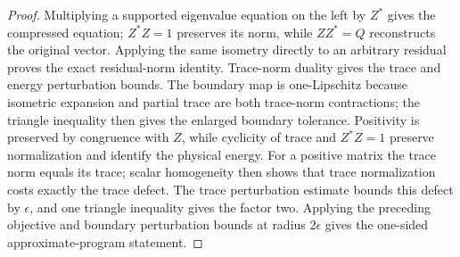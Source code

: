 \begin{proof}
    Multiplying a
    supported eigenvalue equation on the
    left by $Z^*$ gives the compressed equation; $Z^*Z=1$ preserves its norm,
    while $ZZ^*=Q$ reconstructs the original vector.
    Applying the same isometry directly to an arbitrary residual proves the
    exact residual-norm identity.  Trace-norm duality gives the trace and
    energy perturbation bounds.  The boundary map is one-Lipschitz because
    isometric expansion and partial trace are both trace-norm contractions;
    the triangle inequality then gives the enlarged boundary tolerance.
    Positivity is preserved by congruence with $Z$, while cyclicity of trace
    and $Z^*Z=1$ preserve normalization and identify the physical energy.
    For a positive matrix the trace norm equals its trace; scalar homogeneity
    then shows that trace normalization costs exactly the trace defect.  The
    trace perturbation estimate bounds this defect by $\epsilon$, and one
    triangle inequality gives the factor two.  Applying the preceding
    objective and boundary perturbation bounds at radius $2\epsilon$ gives
    the one-sided approximate-program statement.
\end{proof}

